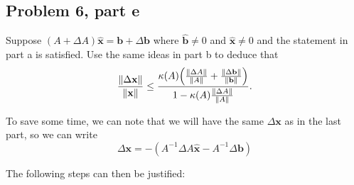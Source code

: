 \subsection{Problem 6, part e}
Suppose $(A + \Delta A) \hat{\textbf{x}} = \textbf{b} + \Delta \textbf{b}$ where $\hat{\textbf{b}}\neq 0$ and $\hat{\textbf{x}}\neq 0$ and the statement in part a is satisfied. Use the same ideas in part b to deduce that 
\[
\frac{\norm{\Delta \textbf{x}}}{\norm{\textbf{x}}} \leq \frac{\kappa(A)\Big( \frac{\norm{\Delta A}}{{\norm{A}}} + \frac{\norm{\Delta \textbf{b}}}{\norm{\textbf{b}}}\Big)}{1 - \kappa(A)\frac{\norm{\Delta A}}{\norm{A}}}.
\]
\partbreak
\begin{solution}

    To save some time, we can note that we will have the same $\Delta \textbf{x}$ as in the last part, so we can write
    \[
    \Delta \textbf{x} = -(A^{-1}\Delta A\hat{\textbf{x}} - A^{-1}\Delta \textbf{b})
    \]

    The following steps can then be justified:


\end{solution}
